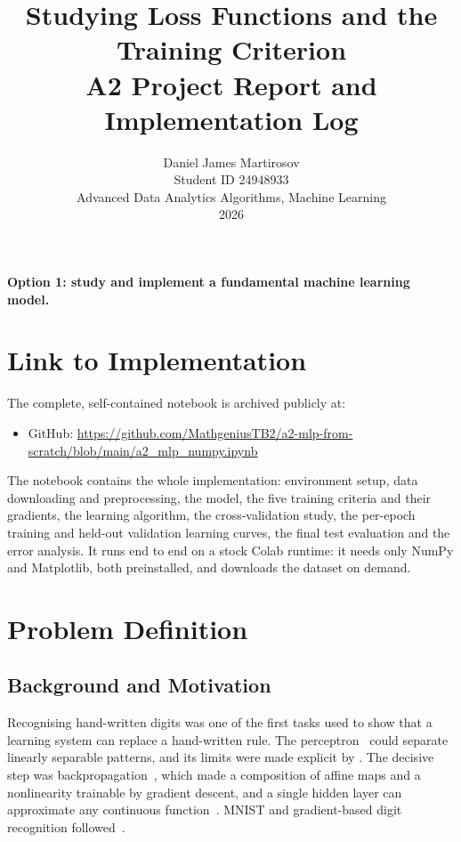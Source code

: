 \documentclass[11pt]{article}
\title{\vspace{-1.5em}\textbf{Studying Loss Functions and the Training Criterion}\\[0.3em]
\large A2 Project Report and Implementation Log}
\author{Daniel James Martirosov\\ Student ID 24948933\\[0.2em]
\normalsize Advanced Data Analytics Algorithms, Machine Learning\\ \normalsize 2026}
\date{}
\begin{document}
\maketitle
\vspace{-2.2em}

\begin{center}
\small
\textbf{Option 1: study and implement a fundamental machine learning model.}
\end{center}

\section*{Link to Implementation}

The complete, self-contained notebook is archived publicly at:

\begin{itemize}
  \item GitHub: \url{https://github.com/MathgeniusTB2/a2-mlp-from-scratch/blob/main/a2_mlp_numpy.ipynb}
\end{itemize}

The notebook contains the whole implementation: environment setup, data downloading and
preprocessing, the model, the five training criteria and their gradients, the learning
algorithm, the cross-validation study, the per-epoch training and held-out validation learning
curves, the final test evaluation and the error analysis. It runs end to end on a stock Colab
runtime: it needs only NumPy and Matplotlib, both preinstalled, and downloads the dataset on
demand.

\section{Problem Definition}
\label{sec:problem}

\subsection{Background and Motivation}

Recognising hand-written digits was one of the first tasks used to show that a learning system
can replace a hand-written rule. The perceptron~\parencite{rosenblatt1958} could separate linearly
separable patterns, and its limits were made explicit by \textcite{minsky1969}. The decisive step was backpropagation~\parencite{rumelhart1986}, which
made a composition of affine maps and a nonlinearity trainable by gradient descent, and a
single hidden layer can approximate any continuous function~\parencite{cybenko1989,hornik1991}.
MNIST and gradient-based digit recognition followed~\parencite{lecun1998}.
\end{document}
